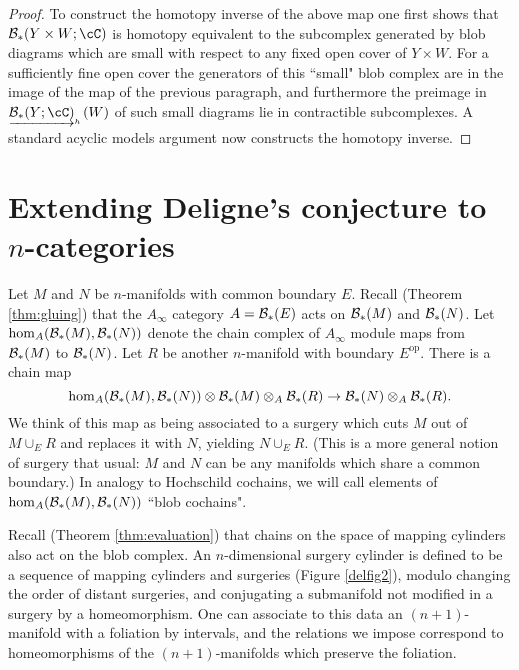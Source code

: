 \documentclass{pnastwo}
\begin{document}
\begin{article}
\begin{proof}
To construct the homotopy inverse of the above map one first shows that
$\bc_*(Y\times W; \cC)$ is homotopy equivalent to the subcomplex generated by blob diagrams which
are small with respect to any fixed open cover of $Y\times W$.
For a sufficiently fine open cover the generators of this ``small" blob complex are in the image of the map
of the previous paragraph, and furthermore the preimage in $\clh{\bc_*(Y;\cC)}(W)$ of such small diagrams
lie in contractible subcomplexes.
A standard acyclic models argument now constructs the homotopy inverse.
\end{proof}


\section{Extending Deligne's conjecture to $n$-categories}
\label{sec:applications}

Let $M$ and $N$ be $n$-manifolds with common boundary $E$.
Recall (Theorem \ref{thm:gluing}) that the $A_\infty$ category $A = {\mathcal B}_*(E)$
acts on ${\mathcal B}_*(M)$ and ${\mathcal B}_*(N)$.
Let $\hom_A({\mathcal B}_*(M), {\mathcal B}_*(N))$ denote the chain complex of $A_\infty$ module maps
from ${\mathcal B}_*(M)$ to ${\mathcal B}_*(N)$.
Let $R$ be another $n$-manifold with boundary $E^\text{op}$.
There is a chain map
\begin{equation*}
	\hom_A({\mathcal B}_*(M), {\mathcal B}_*(N)) \otimes {\mathcal B}_*(M) \otimes_A {\mathcal B}_*(R) \to {\mathcal B}_*(N) \otimes_A {\mathcal B}_*(R) .
\end{equation*}
We think of this map as being associated to a surgery which cuts $M$ out of $M\cup_E R$ and
replaces it with $N$, yielding $N\cup_E R$.
(This is a more general notion of surgery that usual: $M$ and $N$ can be any manifolds
which share a common boundary.)
In analogy to Hochschild cochains, we will call elements of $\hom_A({\mathcal B}_*(M), {\mathcal B}_*(N))$ ``blob cochains".

Recall (Theorem \ref{thm:evaluation}) that chains on the space of mapping cylinders also act on the 
blob complex.
An $n$-dimensional surgery cylinder is 
defined to be a sequence of mapping cylinders and surgeries (Figure \ref{delfig2}), 
modulo changing the order of distant surgeries, and conjugating a submanifold not modified in a surgery by a homeomorphism. 
One can associate to this data an $(n{+}1)$-manifold with a foliation by intervals,
and the relations we impose correspond to homeomorphisms of the $(n{+}1)$-manifolds
which preserve the foliation.


\end{article}
\end{document}
